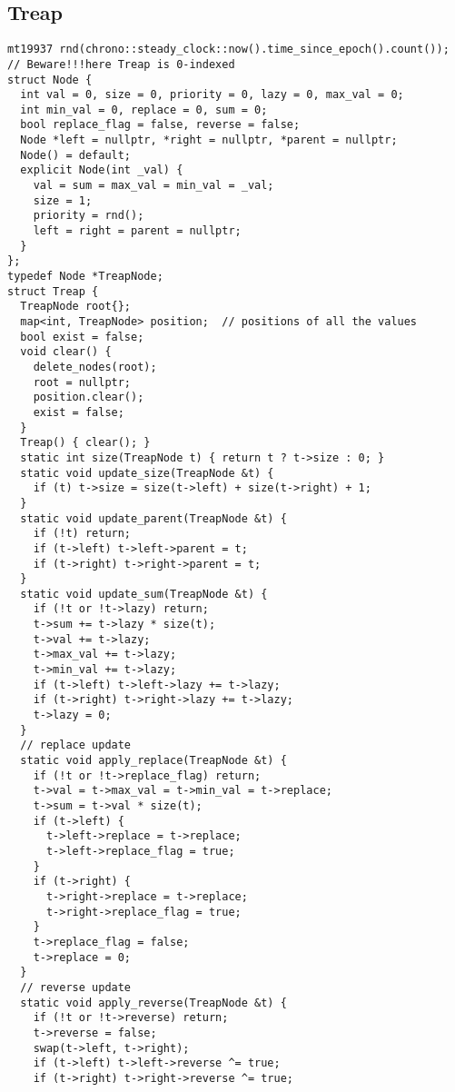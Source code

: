 \documentclass[twoside]{article}
\begin{document}
\begin{multicols*}{2}
{
\subsection*{Treap}
}
\begin{verbatim}
mt19937 rnd(chrono::steady_clock::now().time_since_epoch().count());
// Beware!!!here Treap is 0-indexed
struct Node {
  int val = 0, size = 0, priority = 0, lazy = 0, max_val = 0;
  int min_val = 0, replace = 0, sum = 0;
  bool replace_flag = false, reverse = false;
  Node *left = nullptr, *right = nullptr, *parent = nullptr;
  Node() = default;
  explicit Node(int _val) {
    val = sum = max_val = min_val = _val;
    size = 1;
    priority = rnd();
    left = right = parent = nullptr;
  }
};
typedef Node *TreapNode;
struct Treap {
  TreapNode root{};
  map<int, TreapNode> position;  // positions of all the values
  bool exist = false;
  void clear() {
    delete_nodes(root);
    root = nullptr;
    position.clear();
    exist = false;
  }
  Treap() { clear(); }
  static int size(TreapNode t) { return t ? t->size : 0; }
  static void update_size(TreapNode &t) {
    if (t) t->size = size(t->left) + size(t->right) + 1;
  }
  static void update_parent(TreapNode &t) {
    if (!t) return;
    if (t->left) t->left->parent = t;
    if (t->right) t->right->parent = t;
  }
  static void update_sum(TreapNode &t) {
    if (!t or !t->lazy) return;
    t->sum += t->lazy * size(t);
    t->val += t->lazy;
    t->max_val += t->lazy;
    t->min_val += t->lazy;
    if (t->left) t->left->lazy += t->lazy;
    if (t->right) t->right->lazy += t->lazy;
    t->lazy = 0;
  }
  // replace update
  static void apply_replace(TreapNode &t) {
    if (!t or !t->replace_flag) return;
    t->val = t->max_val = t->min_val = t->replace;
    t->sum = t->val * size(t);
    if (t->left) {
      t->left->replace = t->replace;
      t->left->replace_flag = true;
    }
    if (t->right) {
      t->right->replace = t->replace;
      t->right->replace_flag = true;
    }
    t->replace_flag = false;
    t->replace = 0;
  }
  // reverse update
  static void apply_reverse(TreapNode &t) {
    if (!t or !t->reverse) return;
    t->reverse = false;
    swap(t->left, t->right);
    if (t->left) t->left->reverse ^= true;
    if (t->right) t->right->reverse ^= true;

\end{verbatim}
\end{multicols*}
\end{document}
